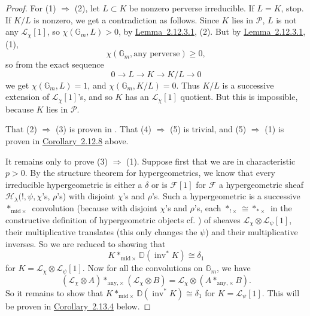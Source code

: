 \begin{proof}
For (1) \(\Rightarrow\) (2), let \(L\subset K\) be nonzero perverse
irreducible. If \(L=K\), stop. If \(K/L\) is nonzero, we get a contradiction
as follows. Since \(K\) lies in \(\mathcal{P}\), \(L\) is not any
\(\mathcal{L}_\chi[1]\), so \(\chi(\mathbb{G}_m,L)>0\), by
\hyperref[lem:2.12.3.1]{Lemma~2.12.3.1}, (2). But by
\hyperref[lem:2.12.3.1]{Lemma~2.12.3.1}, (1),
\[
  \chi(\mathbb{G}_m,\text{any perverse})\geq0,
\]
so from the exact sequence
\[
  0\to L\to K\to K/L\to0
\]
we get \(\chi(\mathbb{G}_m,L)=1\), and \(\chi(\mathbb{G}_m,K/L)=0\). Thus
\(K/L\) is a successive extension of \(\mathcal{L}_\chi[1]\)'s, and so \(K\)
has an \(\mathcal{L}_\chi[1]\) quotient. But this is impossible, because \(K\)
lies in \(\mathcal{P}\).

That (2) \(\Rightarrow\) (3) is proven in \cite[3.5.4 and 8.5.3]{Ka-ESDE}.
That (4) \(\Rightarrow\) (5) is trivial, and (5) \(\Rightarrow\) (1) is
proven in \hyperref[cor:2.12.8]{Corollary~2.12.8} above.

It remains only to prove (3) \(\Rightarrow\) (1). Suppose first that we are in
characteristic \(p>0\). By the structure theorem \cite[8.5.3]{Ka-ESDE} for
hypergeometrics, we know that every irreducible hypergeometric is either a
\(\delta\) or is \(\mathcal{F}[1]\) for \(\mathcal{F}\) a hypergeometric sheaf
\(\mathcal{H}_{\lambda}(!,\psi,\chi\)'s, \(\rho\)'s) with disjoint \(\chi\)'s
and \(\rho\)'s. Such a hypergeometric is a successive
\(*_{\mathrm{mid}\times}\) convolution (because with disjoint \(\chi\)'s and
\(\rho\)'s, each \(*_{!\times}\cong *_{*\times}\) in the constructive
definition of hypergeometric objects cf. \cite[8.4.2 (5)]{Ka-ESDE}) of
sheaves \(\mathcal{L}_\chi\otimes\mathcal{L}_\psi[1]\), their multiplicative
translates (this only changes the \(\psi\)) and their multiplicative inverses.
So we are reduced to showing that
\[
  K*_{\mathrm{mid}\times}\mathbb{D}(\operatorname{inv}^*K)\cong\delta_1
\]
for \(K=\mathcal{L}_\chi\otimes\mathcal{L}_\psi[1]\). Now for all the
convolutions on \(\mathbb{G}_m\), we have
\[
  (\mathcal{L}_\chi\otimes A)*_{\mathrm{any},\times}
  (\mathcal{L}_\chi\otimes B)
  =
  \mathcal{L}_\chi\otimes(A*_{\mathrm{any},\times}B).
\]
So it remains to show that
\(K*_{\mathrm{mid}\times}\mathbb{D}(\operatorname{inv}^*K)\cong\delta_1\) for
\(K=\mathcal{L}_\psi[1]\). This will be proven in
\hyperref[cor:2.13.4]{Corollary~2.13.4} below.


\end{proof}
